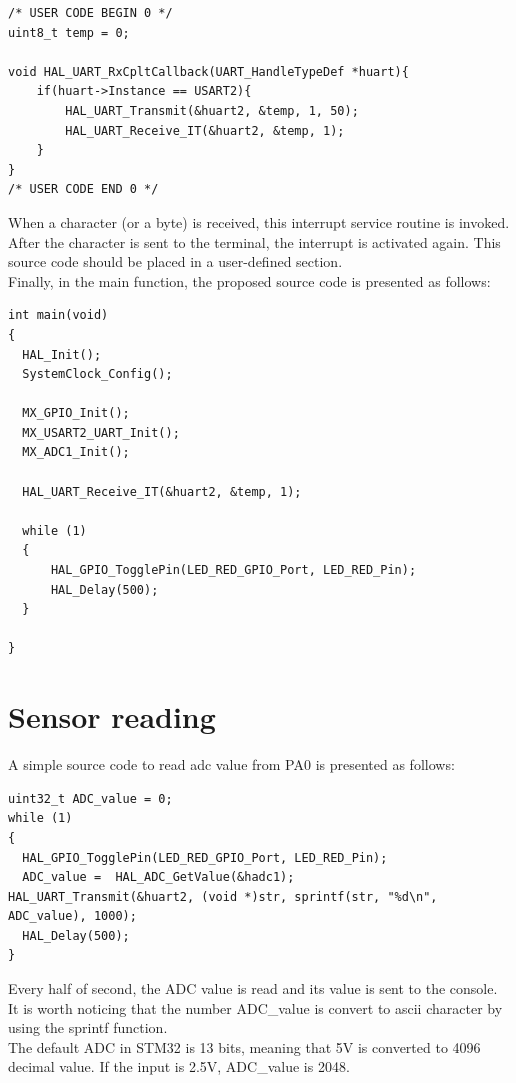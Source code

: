 \begin{lstlisting}[caption= Implement the UART interrupt service routine]
/* USER CODE BEGIN 0 */
uint8_t temp = 0;

void HAL_UART_RxCpltCallback(UART_HandleTypeDef *huart){
	if(huart->Instance == USART2){
		HAL_UART_Transmit(&huart2, &temp, 1, 50);
		HAL_UART_Receive_IT(&huart2, &temp, 1);
	}
}
/* USER CODE END 0 */
\end{lstlisting}

When a character (or a byte) is received, this interrupt service routine is invoked. After the character is sent to the terminal, the interrupt is activated again. This source code should be placed in a user-defined section.\\

Finally, in the main function, the proposed source code is presented as follows:

\begin{lstlisting}[caption=Implement the main function]
int main(void)
{
  HAL_Init();
  SystemClock_Config();

  MX_GPIO_Init();
  MX_USART2_UART_Init();
  MX_ADC1_Init();

  HAL_UART_Receive_IT(&huart2, &temp, 1);

  while (1)
  {
	  HAL_GPIO_TogglePin(LED_RED_GPIO_Port, LED_RED_Pin);
	  HAL_Delay(500);
  }
  
}
\end{lstlisting}

\section{Sensor reading}
A simple source code to read adc value from PA0 is presented as follows:
\begin{lstlisting}[caption=ADC reading from AN0]
uint32_t ADC_value = 0;
while (1)
{
  HAL_GPIO_TogglePin(LED_RED_GPIO_Port, LED_RED_Pin);
  ADC_value =  HAL_ADC_GetValue(&hadc1);
HAL_UART_Transmit(&huart2, (void *)str, sprintf(str, "%d\n", ADC_value), 1000);
  HAL_Delay(500);
}
\end{lstlisting}

Every half of second, the ADC value is read and its value is sent to the console. It is worth noticing that the number ADC\_value is convert to ascii character by  using the sprintf function.\\

The default ADC in STM32 is 13 bits, meaning that 5V is converted to 4096 decimal value. If the input is 2.5V, ADC\_value is 2048.

